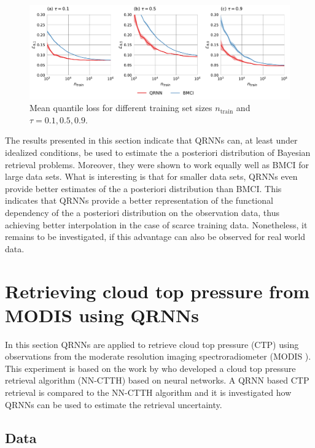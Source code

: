 \documentclass[journal abbreviation, manuscript]{copernicus}
\begin{document}
  \begin{figure}[hbpt!]
    \centering
    \includegraphics[width = 0.8\linewidth]{../plots/fig06}
    \caption{Mean quantile loss for different training set sizes $n_\text{train}$ and
    $\tau = 0.1, 0.5, 0.9$.}
    \label{fig:quantile_losses}
  \end{figure}

The results presented in this section indicate that QRNNs can, at least
under idealized conditions, be used to estimate the a posteriori distribution of 
Bayesian retrieval problems. Moreover, they were shown to work equally well
as BMCI for large data sets. What is interesting is that for smaller data sets,
QRNNs even provide better estimates of the a posteriori distribution than BMCI.
This indicates that QRNNs provide a better representation of the functional
dependency of the a posteriori distribution on the observation data, thus
achieving better interpolation in the case of scarce training data. Nonetheless,
 it remains to be investigated, if this advantage can also be observed for real
world data.

\section{Retrieving cloud top pressure from MODIS using QRNNs}
\label{sec:ctp}

In this section QRNNs are applied to retrieve cloud top pressure (CTP) using
observations from the moderate resolution imaging spectroradiometer (MODIS 
\citet{modis}). This experiment is based on the work by \cite{hakansson} who
developed a cloud top pressure retrieval algorithm (NN-CTTH) based on neural
networks. A QRNN based CTP retrieval is compared to the NN-CTTH algorithm and it
is investigated how QRNNs can be used to estimate the retrieval uncertainty.

\subsection{Data}
\end{document}
